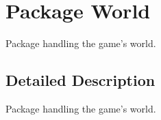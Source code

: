 \hypertarget{namespace_world}{\section{Package World}
\label{namespace_world}
}


Package handling the game's world.  




\subsection{Detailed Description}
Package handling the game's world. 